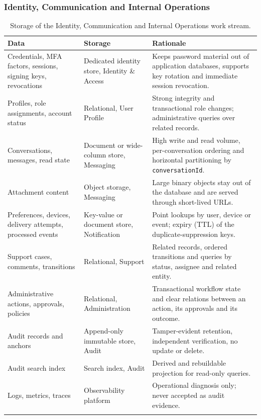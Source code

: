 \subsubsection{Identity, Communication and Internal Operations}
\label{sec:id-storage}

\begin{longtable}{@{}L{3.5cm}L{3.1cm}L{7.2cm}@{}}
\toprule
\textbf{Data} & \textbf{Storage} & \textbf{Rationale} \\
\midrule
\endhead
Credentials, MFA factors, sessions, signing keys, revocations &
  Dedicated identity store, Identity \& Access &
  Keeps password material out of application databases, supports key
  rotation and immediate session revocation. \\
Profiles, role assignments, account status & Relational, User Profile &
  Strong integrity and transactional role changes; administrative queries
  over related records. \\
Conversations, messages, read state & Document or wide-column store,
  Messaging &
  High write and read volume, per-conversation ordering and horizontal
  partitioning by \texttt{conversationId}. \\
Attachment content & Object storage, Messaging &
  Large binary objects stay out of the database and are served through
  short-lived URLs. \\
Preferences, devices, delivery attempts, processed events &
  Key-value or document store, Notification &
  Point lookups by user, device or event; expiry (TTL) of the
  duplicate-suppression keys. \\
Support cases, comments, transitions & Relational, Support &
  Related records, ordered transitions and queries by status, assignee and
  related entity. \\
Administrative actions, approvals, policies & Relational, Administration &
  Transactional workflow state and clear relations between an action, its
  approvals and its outcome. \\
Audit records and anchors & Append-only immutable store, Audit &
  Tamper-evident retention, independent verification, no update or delete. \\
Audit search index & Search index, Audit &
  Derived and rebuildable projection for read-only queries. \\
Logs, metrics, traces & Observability platform &
  Operational diagnosis only; never accepted as audit evidence. \\
\bottomrule
\caption{Storage of the Identity, Communication and Internal Operations work
stream.}
\label{tab:id-storage}
\end{longtable}

